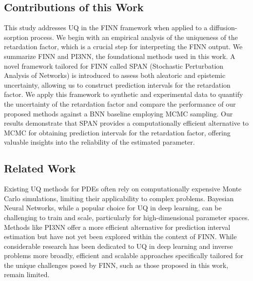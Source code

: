 \subsection{Contributions of this Work}
This study addresses UQ in the FINN framework when applied to a diffusion-sorption process. We begin with an empirical analysis of the uniqueness of the retardation factor, which is a crucial step for interpreting the FINN output. We summarize FINN and PI3NN, the foundational methods used in this work.
A novel framework tailored for FINN called SPAN (Stochastic Perturbation Analysis of Networks) is introduced to assess both aleatoric and epistemic uncertainty, allowing us to construct prediction intervals for the retardation factor.
We apply this framework to synthetic and experimental data to quantify the uncertainty of the retardation factor and compare the performance of our proposed methods against a BNN baseline employing MCMC sampling. Our results demonstrate that SPAN provides a computationally efficient alternative to MCMC for obtaining prediction intervals for the retardation factor, offering valuable insights into the reliability of the estimated parameter.


\subsection{Related Work}
Existing UQ methods for PDEs often rely on computationally expensive Monte Carlo simulations, limiting their applicability to complex problems. Bayesian Neural Networks, while a popular choice for UQ in deep learning, can be challenging to train and scale, particularly for high-dimensional parameter spaces. Methods like PI3NN offer a more efficient alternative for prediction interval estimation but have not yet been explored within the context of FINN. While considerable research has been dedicated to UQ in deep learning and inverse problems more broadly, efficient and scalable approaches specifically tailored for the unique challenges posed by FINN, such as those proposed in this work, remain limited. %


